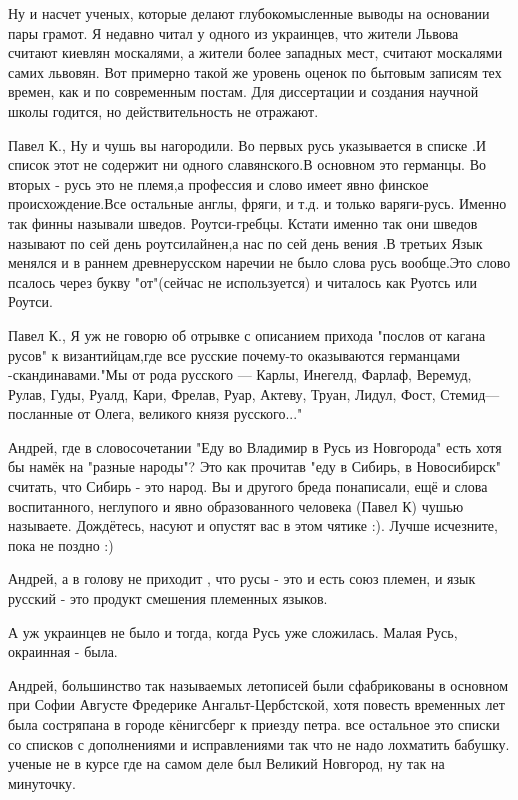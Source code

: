 \begin{itemize}
Ну и насчет ученых, которые делают глубокомысленные выводы на основании пары
грамот. Я недавно читал у одного из украинцев, что жители Львова считают
киевлян москалями, а жители более западных мест, считают москалями самих
львовян. Вот примерно такой же уровень оценок по бытовым записям тех времен,
как и по современным постам. Для диссертации и создания научной школы годится,
но действительность не отражают.


Павел К., Ну и чушь вы нагородили. Во первых русь указывается в списке .И
список этот не содержит ни одного славянского.В основном это германцы. Во
вторых - русь это не племя,а профессия и слово имеет явно финское
происхождение.Все остальные англы, фряги, и т.д. и только варяги-русь. Именно
так финны называли шведов. Роутси-гребцы. Кстати именно так они шведов называют
по сей день роутсилайнен,а нас по сей день вения .В третьих Язык менялся и в
раннем древнерусском наречии не было слова русь вообще.Это слово псалось через
букву "от"(сейчас не используется) и читалось как Руотсь или Роутси.


Павел К., Я уж не говорю об отрывке с описанием прихода "послов от кагана
русов" к византийцам,где все русские почему-то оказываются германцами
-скандинавами."Мы от рода русского — Карлы, Инегелд, Фарлаф, Веремуд, Рулав,
Гуды, Руалд, Кари, Фрелав, Руар, Актеву, Труан, Лидул, Фост, Стемид— посланные
от Олега, великого князя русского..."


Андрей, где в словосочетании "Еду во Владимир в Русь из Новгорода" есть хотя бы
намёк на "разные народы"? Это как прочитав "еду в Сибирь, в Новосибирск"
считать, что Сибирь - это народ. Вы и другого бреда понаписали, ещё и слова
воспитанного, неглупого и явно образованного человека (Павел К) чушью
называете. Дождётесь, насуют и опустят вас в этом чятике :). Лучше исчезните,
пока не поздно :)


Андрей, а в голову не приходит , что русы - это и есть союз племен, и язык
русский - это продукт смешения племенных языков.

А уж украинцев не было и тогда, когда Русь уже сложилась. Малая Русь, окраинная
- была.


Андрей, большинство так называемых летописей были сфабрикованы в основном при
Софии Августе Фредерике Ангальт-Цербстской, хотя повесть временных лет была
состряпана в городе кёнигсберг к приезду петра. все остальное это списки со
списков с дополнениями и исправлениями так что не надо лохматить бабушку.
ученые не в курсе где на самом деле был Великий Новгород, ну так на минуточку.


\end{itemize}
